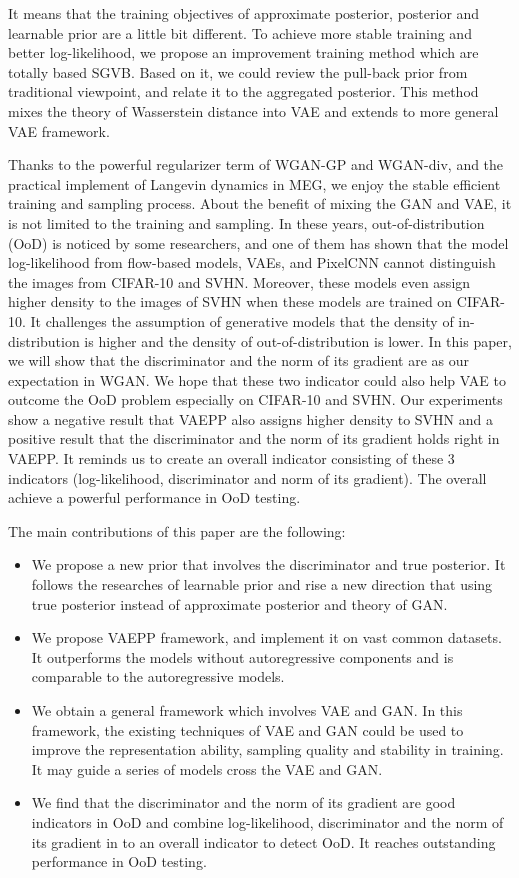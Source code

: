 It means that the training objectives of approximate posterior, posterior and learnable prior are a little bit different. To achieve more stable training and better log-likelihood, we propose an improvement training method which are totally based SGVB. Based on it, we could review the pull-back prior from traditional viewpoint, and relate it to the aggregated posterior. This method mixes the theory of Wasserstein distance into VAE and extends to more general VAE framework. 

Thanks to the powerful regularizer term of WGAN-GP and WGAN-div, and the practical implement of Langevin dynamics in MEG, we enjoy the stable efficient training and sampling process. About the benefit of mixing the GAN and VAE, it is not limited to the training and sampling. In these years, out-of-distribution (OoD) is noticed by some researchers, and one of them has shown that the model log-likelihood from flow-based models, VAEs, and PixelCNN cannot distinguish the images from CIFAR-10 and SVHN. Moreover, these models even assign higher density to the images of SVHN when these models are trained on CIFAR-10. It challenges the assumption of generative models that the density of in-distribution is higher and the density of out-of-distribution is lower. In this paper, we will show that the discriminator and the norm of its gradient are as our expectation in WGAN. We hope that these two indicator could also help VAE to outcome the OoD problem especially on CIFAR-10 and SVHN. Our experiments show a negative result that VAEPP also assigns higher density to SVHN and a positive result that the discriminator and the norm of its gradient holds right in VAEPP. It reminds us to create an overall indicator consisting of these 3 indicators (log-likelihood, discriminator and norm of its gradient). The overall achieve a powerful performance in OoD testing.  

The main contributions of this paper are the following:
\begin{itemize}
	\item We propose a new prior that involves the discriminator and true posterior. It follows the researches of learnable prior and rise a new direction that using true posterior instead of approximate posterior and theory of GAN. 
	\item We propose VAEPP framework, and implement it on vast common datasets. It outperforms the models without autoregressive components and is comparable to the autoregressive models. 
	\item We obtain a general framework which involves VAE and GAN. In this framework, the existing techniques of VAE and GAN could be used to improve the representation ability, sampling quality and stability in training. It may guide a series of models cross the VAE and GAN. 
	\item We find that the discriminator and the norm of its gradient are good indicators in OoD and combine log-likelihood, discriminator and the norm of its gradient in to an overall indicator to detect OoD. It reaches outstanding performance in OoD testing.
\end{itemize}
